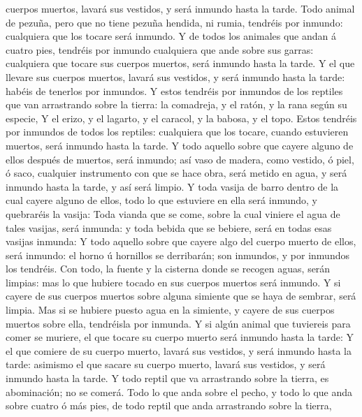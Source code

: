 cuerpos muertos, lavará sus vestidos, y será inmundo hasta la tarde.
 Todo animal de pezuña, pero que no tiene pezuña hendida,
ni rumia, tendréis por inmundo: cualquiera que los tocare será inmundo.
 Y de todos los animales que andan á cuatro pies, tendréis
por inmundo cualquiera que ande sobre sus garras: cualquiera que tocare
sus cuerpos muertos, será inmundo hasta la tarde.  Y el que
llevare sus cuerpos muertos, lavará sus vestidos, y será inmundo hasta
la tarde: habéis de tenerlos por inmundos.  Y estos
tendréis por inmundos de los reptiles que van arrastrando sobre la
tierra: la comadreja, y el ratón, y la rana según su especie,
 Y el erizo, y el lagarto, y el caracol, y la babosa, y el
topo.  Estos tendréis por inmundos de todos los reptiles:
cualquiera que los tocare, cuando estuvieren muertos, será inmundo hasta
la tarde.  Y todo aquello sobre que cayere alguno de ellos
después de muertos, será inmundo; así vaso de madera, como vestido, ó
piel, ó saco, cualquier instrumento con que se hace obra, será metido en
agua, y será inmundo hasta la tarde, y así será limpio.  Y
toda vasija de barro dentro de la cual cayere alguno de ellos, todo lo
que estuviere en ella será inmundo, y quebraréis la vasija:
 Toda vianda que se come, sobre la cual viniere el agua de
tales vasijas, será inmunda: y toda bebida que se bebiere, será en todas
esas vasijas inmunda:  Y todo aquello sobre que cayere algo
del cuerpo muerto de ellos, será inmundo: el horno ú hornillos se
derribarán; son inmundos, y por inmundos los tendréis.  Con
todo, la fuente y la cisterna donde se recogen aguas, serán limpias: mas
lo que hubiere tocado en sus cuerpos muertos será inmundo. 
Y si cayere de sus cuerpos muertos sobre alguna simiente que se haya de
sembrar, será limpia.  Mas si se hubiere puesto agua en la
simiente, y cayere de sus cuerpos muertos sobre ella, tendréisla por
inmunda.  Y si algún animal que tuviereis para comer se
muriere, el que tocare su cuerpo muerto será inmundo hasta la tarde:
 Y el que comiere de su cuerpo muerto, lavará sus vestidos,
y será inmundo hasta la tarde: asimismo el que sacare su cuerpo muerto,
lavará sus vestidos, y será inmundo hasta la tarde.  Y todo
reptil que va arrastrando sobre la tierra, es abominación; no se comerá.
 Todo lo que anda sobre el pecho, y todo lo que anda sobre
cuatro ó más pies, de todo reptil que anda arrastrando sobre la tierra,
